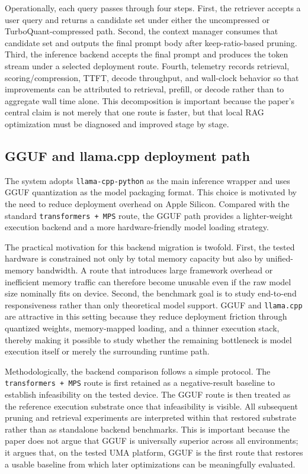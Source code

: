 \documentclass[10pt,twocolumn]{article}
\begin{document}
Operationally, each query passes through four steps. First, the retriever accepts a user query and returns a candidate set under either the uncompressed or TurboQuant-compressed path. Second, the context manager consumes that candidate set and outputs the final prompt body after keep-ratio-based pruning. Third, the inference backend accepts the final prompt and produces the token stream under a selected deployment route. Fourth, telemetry records retrieval, scoring/compression, TTFT, decode throughput, and wall-clock behavior so that improvements can be attributed to retrieval, prefill, or decode rather than to aggregate wall time alone. This decomposition is important because the paper's central claim is not merely that one route is faster, but that local RAG optimization must be diagnosed and improved stage by stage.

\subsection{GGUF and llama.cpp deployment path}

The system adopts \texttt{llama-cpp-python} as the main inference wrapper and uses GGUF quantization as the model packaging format. This choice is motivated by the need to reduce deployment overhead on Apple Silicon. Compared with the standard \texttt{transformers + MPS} route, the GGUF path provides a lighter-weight execution backend and a more hardware-friendly model loading strategy.

The practical motivation for this backend migration is twofold. First, the tested hardware is constrained not only by total memory capacity but also by unified-memory bandwidth. A route that introduces large framework overhead or inefficient memory traffic can therefore become unusable even if the raw model size nominally fits on device. Second, the benchmark goal is to study end-to-end responsiveness rather than only theoretical model support. GGUF and \texttt{llama.cpp} are attractive in this setting because they reduce deployment friction through quantized weights, memory-mapped loading, and a thinner execution stack, thereby making it possible to study whether the remaining bottleneck is model execution itself or merely the surrounding runtime path.

Methodologically, the backend comparison follows a simple protocol. The \texttt{transformers + MPS} route is first retained as a negative-result baseline to establish infeasibility on the tested device. The GGUF route is then treated as the reference execution substrate once that infeasibility is visible. All subsequent pruning and retrieval experiments are interpreted within that restored substrate rather than as standalone backend benchmarks. This is important because the paper does not argue that GGUF is universally superior across all environments; it argues that, on the tested UMA platform, GGUF is the first route that restores a usable baseline from which later optimizations can be meaningfully evaluated.
\end{document}
